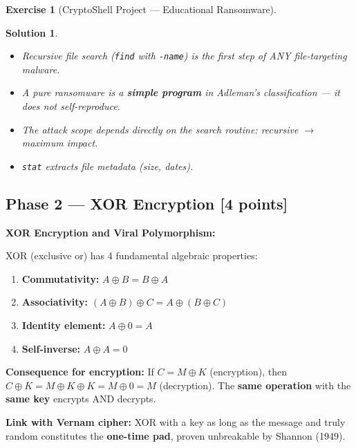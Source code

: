 \documentclass[a4paper,11pt]{article}
\theoremstyle{plain}
\newtheorem{correction}{Solution}
\theoremstyle{definition}
\newtheorem{exercice}{Exercise}
\begin{document}
\begin{exercice}[CryptoShell Project --- Educational Ransomware]
\begin{correction}
\begin{pointcle}
\begin{itemize}
    \item Recursive file search (\texttt{find} with \texttt{-name}) is the first step of ANY file-targeting malware.
    \item A pure ransomware is a \textbf{simple program} in Adleman's classification --- it does not self-reproduce.
    \item The attack scope depends directly on the search routine: recursive $\to$ maximum impact.
    \item \texttt{stat} extracts file metadata (size, dates).
\end{itemize}
\end{pointcle}

\end{correction}



\subsection*{Phase 2 --- XOR Encryption \hfill \normalsize [4 points]}

\begin{rappel}
\textbf{XOR Encryption and Viral Polymorphism:}

XOR (exclusive or) has 4 fundamental algebraic properties:
\begin{enumerate}
    \item \textbf{Commutativity:} $A \oplus B = B \oplus A$
    \item \textbf{Associativity:} $(A \oplus B) \oplus C = A \oplus (B \oplus C)$
    \item \textbf{Identity element:} $A \oplus 0 = A$
    \item \textbf{Self-inverse:} $A \oplus A = 0$
\end{enumerate}

\medskip
\textbf{Consequence for encryption:} If $C = M \oplus K$ (encryption), then $C \oplus K = M \oplus K \oplus K = M \oplus 0 = M$ (decryption). The \textbf{same operation} with the \textbf{same key} encrypts AND decrypts.

\medskip
\textbf{Link with Vernam cipher:} XOR with a key as long as the message and truly random constitutes the \textbf{one-time pad}, proven unbreakable by Shannon (1949).


\end{rappel}
\end{exercice}
\end{document}
